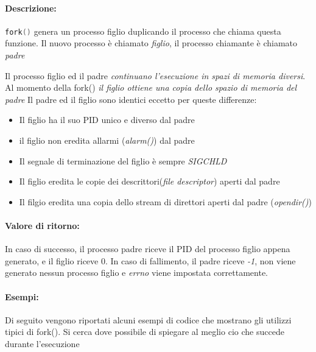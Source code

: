 \documentclass
    [10pt,        %
     a4paper,     %
     onecolumn,   %
     fleqn,       %
     oneside,     %
     notitlepage, %
     openany      %
     ]
    {article}
\begin{document}
\paragraph{Descrizione:}
\lstinline[language=C]!fork()! genera un processo figlio duplicando il processo che chiama questa funzione.
Il nuovo processo è chiamato \textit{figlio}, il processo chiamante è chiamato \textit{padre}

Il processo figlio ed il padre \textit{continuano l'esecuzione in spazi di memoria diversi}. Al momento della fork() \textit{il figlio ottiene una copia dello spazio di memoria del padre}
Il padre ed il figlio sono identici eccetto per queste differenze:
\begin{itemize}
    \item Il figlio ha il suo PID unico e diverso dal padre
    \item il figlio non eredita allarmi (\textit{alarm()}) dal padre
    \item Il segnale di terminazione del figlio è sempre \textit{SIGCHLD}
    \item Il figlio eredita le copie dei descrittori(\textit{file descriptor}) aperti dal padre
    \item Il filgio eredita una copia dello stream di direttori aperti dal padre (\textit{opendir()})
\end{itemize}
\paragraph{Valore di ritorno:}
In caso di successo, il processo padre riceve il PID del processo figlio appena generato, e il figlio riceve 0. 
In caso di fallimento, il padre riceve \textit{-1}, non viene generato nessun processo figlio e \textit{errno} viene impostata correttamente.
\paragraph{Esempi:}
Di seguito vengono riportati alcuni esempi di codice che mostrano gli utilizzi tipici di fork(). Si cerca dove possibile di spiegare al meglio cio che succede durante l'esecuzione
\end{document}
